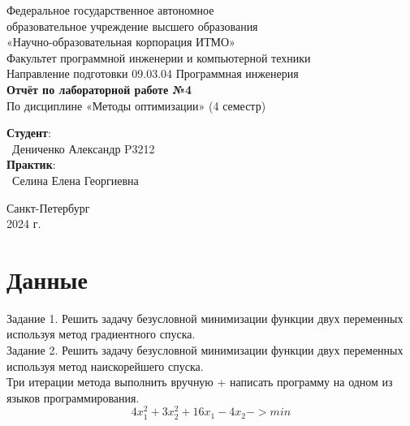 \documentclass{article}
\begin{document}
\begin{center}
    \Large
    Федеральное государственное автономное \\
    образовательное учреждение высшего образования \\ 
    «Научно-образовательная корпорация ИТМО»\\
    \vspace{0.5cm}
    \large
    Факультет программной инженерии и компьютерной техники \\
    Направление подготовки 09.03.04 Программная инженерия \\
    \vspace{1cm}
    \Large
    \textbf{Отчёт по лабораторной работе №4} \\
    По дисциплине «Методы оптимизации» (4 семестр)\\
    \large
    \vspace{8cm}

    \begin{minipage}{.33\textwidth}
    \end{minipage}
    \hfill
    \begin{minipage}{.4\textwidth}
    
        \textbf{Студент}: \vspace{.1cm} \\
        \ Дениченко Александр P3212\\
        \textbf{Практик}:  \\
        \ Селина Елена Георгиевна
    \end{minipage}
    \vfill
Санкт-Петербург\\ 2024 г.
\end{center}
\pagestyle{empty}
\newpage
\pagestyle{plain}

\section*{Данные}
Задание 1. Решить задачу безусловной минимизации функции двух переменных используя метод градиентного спуска.\\
Задание 2. Решить задачу безусловной минимизации функции двух переменных используя метод наискорейшего спуска.\\
Три итерации метода выполнить вручную + написать программу на одном из языков программирования.\\
\[4x_1^2+3x_2^2+16x_1-4x_2 -> min\]
\end{document}
